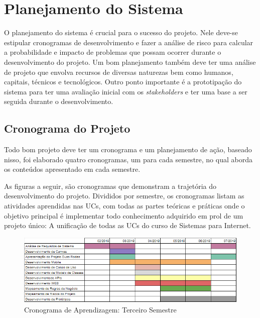 \chapter{Planejamento do Sistema}

O planejamento do sistema é crucial para o sucesso do projeto. Nele deve-se estipular cronogramas de desenvolvimento e fazer a análise de risco para calcular a probabilidade e impacto de problemas que possam ocorrer durante o desenvolvimento do projeto.
Um bom planejamento também deve ter uma análise de projeto que envolva recursos de diversas naturezas bem como humanos, capitais, técnicos e tecnológicos.
Outro ponto importante é a prototipação do sistema para ter uma avaliação inicial com os \textit{stakeholders} e ter uma base a ser seguida durante o desenvolvimento.

\section{Cronograma do Projeto}


Todo bom projeto deve ter um cronograma e um planejamento de ação, baseado nisso, foi elaborado quatro cronogramas, um para cada semestre, no qual aborda os conteúdos apresentado em cada semestre.

As figuras a seguir, são cronogramas que demonstram a trajetória do desenvolvimento do projeto. Divididos por semestre, os cronogramas listam as atividades aprendidas nas UCs, com todas as partes teóricas e práticas onde o objetivo principal é implementar todo conhecimento adquirido em prol de um projeto único: A unificação de todas as UCs do curso de Sistemas para Internet.

\begin{figure}[H]
\caption{\label{cron-3-semestre}Cronograma de Aprendizagem: Terceiro Semestre}
\begin{center}
	\includegraphics[scale=0.90]{./Figuras/cronograma-3-semestre.png}
\end{center}
\end{figure}


